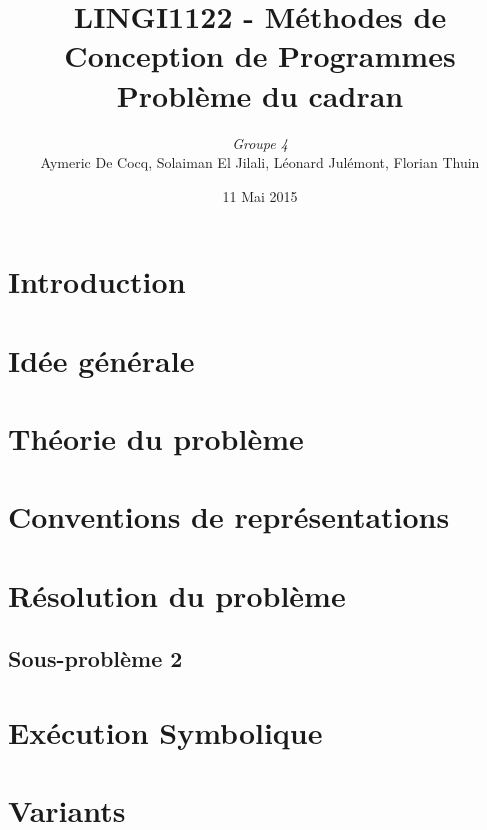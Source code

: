\documentclass[11pt,a4paper]{article}
\author{\textit{Groupe 4}\\
Aymeric De Cocq, Solaiman El Jilali, Léonard Julémont, Florian Thuin}
\title{LINGI1122 - Méthodes de Conception de Programmes\\
Problème du cadran}
\date{11 Mai 2015}
\begin{document}
\maketitle

\section* {Introduction}


\section{Idée générale}


 
\section{Théorie du problème}


\section{Conventions de représentations}


\section{Résolution du problème}




\subsection{Sous-problème 2}

\section{Exécution Symbolique}

\section{Variants}
\end{document}
